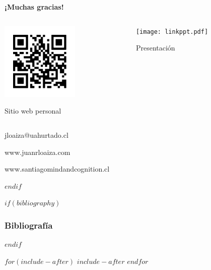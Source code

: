 \documentclass[%
    $if(fontsize)$
        $fontsize$, %
    $else$
        9pt,
    $endif$
    $if(lang)$
        $babel-lang$, %
    $endif$
    $if(papersize)$
        $papersize$paper, %
    $endif$
    $if(beamer)$
        ignorenonframetext,
        $if(handout)$
            handout, %
        $endif$
        aspectratio=$if(aspectratio)$$aspectratio$$else$169$endif$, %
    $endif$
    $for(classoption)$
        $classoption$$sep$, %
    $endfor$
]{$documentclass$}
\begin{document}
\section{}
\begin{frame}

    \centering
    {\LARGE
    \textbf{¡Muchas gracias!}}
    \vspace{-1em
    
    
    
    
    
    
    
    
    
    }

    \begin{minipage}[t]{0.7\textwidth}
    \begin{columns}
      \begin{column}{0.5\textwidth}
        \centering
        {
      \includegraphics[height=10em]{qr_juanrloaizacom.pdf}

      Sitio web personal
}
      \end{column}

      \begin{column}{0.5\textwidth}
        \centering
        {
      \texttt{[image: linkppt.pdf]}

      Presentación
}
      \end{column}
    \end{columns}
  \end{minipage}


    jloaiza@uahurtado.cl

    www.juanrloaiza.com

    www.santiagomindandcognition.cl

\end{frame}
$endif$

$if(bibliography)$
\begin{frame}[allowframebreaks]
\frametitle{Bibliografía}
\printbibliography
\end{frame}
$endif$


$for(include-after)$
$include-after$
$endfor$
\end{document}
